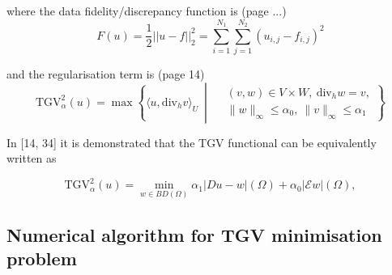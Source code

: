 \documentclass{article}
\begin{document}
where
the data fidelity/discrepancy function is (page ...)
\begin{equation}
    F(u) = \frac{1}{2} || u - f ||^2_2 = \sum_{i=1}^{N_1} \sum_{j=1}^{N_2} (u_{i,j} - f_{i,j})^2
\end{equation}

and
the regularisation term is (page 14)
\begin{equation}
    \mathrm{TGV}^2_\alpha(u) = \max \left\{ \langle u, \mathrm{div}_h v \rangle_U \ \middle| \ 
    \begin{aligned}
    &(v, w) \in V \times W, \ \mathrm{div}_h w = v, \\
    &\|w\|_\infty \leq \alpha_0, \ \|v\|_\infty \leq \alpha_1 
    \end{aligned}
    \right\}
\end{equation}

In [14, 34] it is demonstrated that the TGV functional can be equivalently written as

\begin{equation}
    \text{TGV}^2_{\alpha}(u) = \min_{w \in BD(\Omega)} \alpha_1 \lvert Du - w \rvert (\Omega) + \alpha_0 \lvert \mathcal{E} w \rvert (\Omega),
\end{equation}
    




\subsection{
Numerical
algorithm for TGV minimisation problem
}

\end{document}
